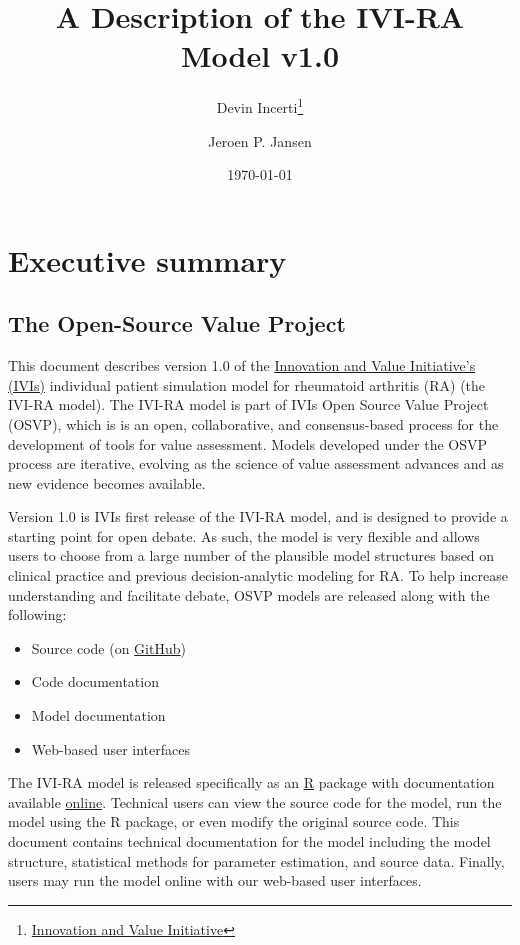 \documentclass[11pt,final,fleqn]{article}\usepackage[]{graphicx}\usepackage[]{color}
\title{A Description of the IVI-RA Model v1.0}
\author{Devin Incerti\footnote{\href{http://www.thevalueinitiative.org/}{Innovation and Value Initiative}} \and Jeroen P. Jansen\sameaff}
\date{\today}
\theoremstyle{plain}
\newcommand\R{{\textsf{R}}}
\begin{document}
\maketitle

\begingroup
 \hypersetup{linkcolor=black} \tableofcontents
 \listoffigures
 \listoftables
\endgroup



\section*{Executive summary}\label{sec:executive-summary}
\subsection*{The Open-Source Value Project}
This document describes version 1.0 of the \href{http://www.thevalueinitiative.org/}{Innovation and Value Initiative's (IVIs)} individual patient simulation model for rheumatoid arthritis (RA) (the IVI-RA model). The IVI-RA model is part of IVIs Open Source Value Project (OSVP), which is is an open, collaborative, and consensus-based process for the development of tools for value assessment. Models developed under the OSVP process are iterative, evolving as the science of value assessment advances and as new evidence becomes available.

Version 1.0 is IVIs first release of the IVI-RA model, and is designed to provide a starting point for open debate. As such, the model is very flexible and allows users to choose from a large number of the plausible model structures based on clinical practice and previous decision-analytic modeling for RA. To help increase understanding and facilitate debate, OSVP models are released along with the following:

\begin{itemize}
\item Source code (on \href{https://github.com/}{GitHub})
\item Code documentation
\item Model documentation
\item Web-based user interfaces
\end{itemize}

The IVI-RA model is released specifically as an \href{https://cran.r-project.org/}{\R{}} package with documentation available \href{https://innovationvalueinitiative.github.io/IVI-RA/index.html}{online}. Technical users can view the source code for the model, run the model using the R package, or even modify the original source code. This document contains technical documentation for the model including the model structure, statistical methods for parameter estimation, and source data. Finally, users may run the model online with our web-based user interfaces. 
\end{document}
